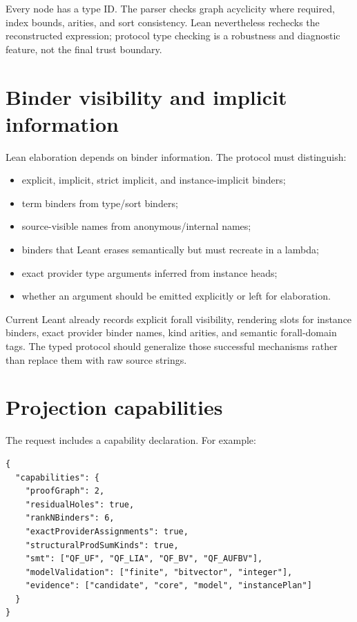 \documentclass[11pt,letterpaper,openany]{report}
\begin{document}
Every node has a type ID. The parser checks graph acyclicity where required, index
bounds, arities, and sort consistency. Lean nevertheless rechecks the reconstructed
expression; protocol type checking is a robustness and diagnostic feature, not the
final trust boundary.

\section{Binder visibility and implicit information}

Lean elaboration depends on binder information. The protocol must distinguish:

\begin{itemize}
  \item explicit, implicit, strict implicit, and instance-implicit binders;
  \item term binders from type/sort binders;
  \item source-visible names from anonymous/internal names;
  \item binders that Leant erases semantically but must recreate in a lambda;
  \item exact provider type arguments inferred from instance heads;
  \item whether an argument should be emitted explicitly or left for elaboration.
\end{itemize}

Current Leant already records explicit forall visibility, rendering slots for instance
binders, exact provider binder names, kind arities, and semantic forall-domain tags.
The typed protocol should generalize those successful mechanisms rather than replace
them with raw source strings.

\section{Projection capabilities}

The request includes a capability declaration. For example:

\begin{lstlisting}[language=JSONLite,caption={Illustrative capability negotiation}]
{
  "capabilities": {
    "proofGraph": 2,
    "residualHoles": true,
    "rankNBinders": 6,
    "exactProviderAssignments": true,
    "structuralProdSumKinds": true,
    "smt": ["QF_UF", "QF_LIA", "QF_BV", "QF_AUFBV"],
    "modelValidation": ["finite", "bitvector", "integer"],
    "evidence": ["candidate", "core", "model", "instancePlan"]
  }
}
\end{lstlisting}
\end{document}
